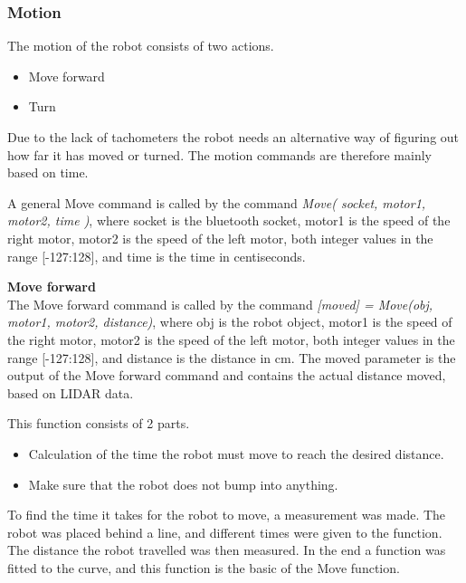 \subsubsection{Motion}
The motion of the robot consists of two actions.
\begin{itemize}
\item Move forward 
\item Turn
\end{itemize}
Due to the lack of tachometers the robot needs an alternative way of figuring out how far it has moved or turned. The motion commands are therefore mainly based on time.

A general Move command is called by the command \textit{Move( socket, motor1, motor2, time )}, where socket is the bluetooth socket, motor1 is the speed of the right motor, motor2 is the speed of the left motor, both integer values in the range [-127:128], and time is the time in centiseconds.

\textbf{Move forward}\\
The Move forward command is called by the command \textit{[moved] = Move(obj, motor1, motor2, distance)}, where obj is the robot object, motor1 is the speed of the right motor, motor2 is the speed of the left motor, both integer values in the range [-127:128], and distance is the distance in cm. The moved parameter is the output of the Move forward command and contains the actual distance moved, based on LIDAR data.

This function consists of 2 parts. 
\begin{itemize}
\item Calculation of the time the robot must move to reach the desired distance.
\item Make sure that the robot does not bump into anything.
\end{itemize}
To find the time it takes for the robot to move, a measurement was made. The robot was placed behind a line, and different times were given to the function. The distance the robot travelled was then measured. In the end a function was fitted to the curve, and this function is the basic of the Move function.

